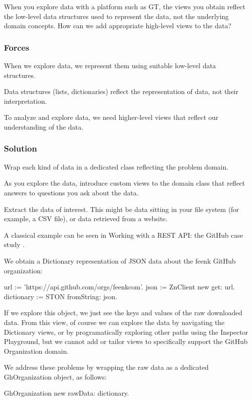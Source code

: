 \documentclass[sigconf]{acmart}
\begin{document}
When you explore data with a platform such as GT, the views you obtain reflect the low-level data structures used to represent the data, not the underlying domain concepts. How can we add appropriate high-level views to the data?

\subsubsection*{Forces}

When we explore data, we represent them using suitable low-level data structures.

Data structures (lists, dictionaries) reflect the representation of data, not their interpretation.

To analyze and explore data, we need higher-level views that reflect our understanding of the data.

\subsubsection*{Solution}

Wrap each kind of data in a dedicated class reflecting the problem domain. 

As you explore the data, introduce custom views to the domain class that reflect answers to questions you ask about the data.

Extract the data of interest. This might be data sitting in your file system (for example, a CSV file), or data retrieved from a website.

A classical example can be seen in Working with a REST API: the GitHub case study .

We obtain a Dictionary representation of JSON data about the feenk GitHub organization:

url := 'https://api.github.com/orgs/feenkcom'.
json := ZnClient new get: url.
dictionary := STON fromString: json.
  
If we explore this object, we just see the keys and values of the raw downloaded data. From this view, of course we can explore the data by navigating the Dictionary views, or by programatically exploring other paths using the Inspector Playground, but we cannot add or tailor views to specifically support the GitHub Organization domain.

We address these problems by wrapping the raw data as a dedicated GhOrganization object, as follows:

GhOrganization new rawData: dictionary.
  
\end{document}
